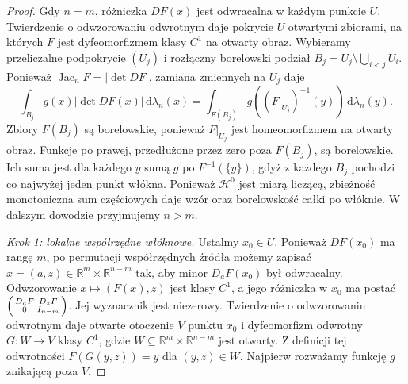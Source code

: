 \begin{proof}
Gdy $n=m$, różniczka $DF(x)$ jest odwracalna
w każdym punkcie $U$. Twierdzenie o odwzorowaniu
odwrotnym daje pokrycie $U$ otwartymi zbiorami,
na których $F$ jest dyfeomorfizmem klasy $C^1$
na otwarty obraz. Wybieramy przeliczalne podpokrycie
$(U_j)$ i rozłączny borelowski podział
$B_j=U_j\setminus\bigcup_{i<j}U_i$.
Ponieważ $\operatorname{Jac}_nF=|\det DF|$,
zamiana zmiennych na $U_j$ daje
\[
 \int_{B_j}g(x)|\det DF(x)|\,\mathrm d\lambda_n(x)
 =\int_{F(B_j)}g((F|_{U_j})^{-1}(y))
 \,\mathrm d\lambda_n(y).
\]
Zbiory $F(B_j)$ są borelowskie, ponieważ
$F|_{U_j}$ jest homeomorfizmem na otwarty obraz.
Funkcje po prawej, przedłużone przez zero poza
$F(B_j)$, są borelowskie. Ich suma jest dla każdego
$y$ sumą $g$ po $F^{-1}(\{y\})$, gdyż z każdego
$B_j$ pochodzi co najwyżej jeden punkt włókna.
Ponieważ $\mathcal H^0$ jest miarą liczącą,
zbieżność monotoniczna sum częściowych daje wzór
oraz borelowskość całki po włóknie.
W dalszym dowodzie przyjmujemy $n>m$.

\emph{Krok 1: lokalne współrzędne włóknowe.}
Ustalmy $x_0\in U$. Ponieważ $DF(x_0)$ ma rangę $m$,
po permutacji współrzędnych źródła możemy zapisać
$x=(a,z)\in\mathbb R^m\times\mathbb R^{n-m}$
tak, aby minor $D_aF(x_0)$ był odwracalny.
Odwzorowanie $x\mapsto(F(x),z)$ jest klasy $C^1$,
a jego różniczka w $x_0$ ma postać
$\begin{psmallmatrix}D_aF&D_zF\\0&I_{n-m}\end{psmallmatrix}$.
Jej wyznacznik jest niezerowy. Twierdzenie o odwzorowaniu
odwrotnym daje otwarte otoczenie $V$ punktu $x_0$
i dyfeomorfizm odwrotny $G:W\to V$ klasy $C^1$,
gdzie $W\subseteq\mathbb R^m\times\mathbb R^{n-m}$
jest otwarty. Z definicji tej odwrotności
$F(G(y,z))=y$ dla $(y,z)\in W$.
Najpierw rozważamy funkcję $g$ znikającą poza $V$.


\end{proof}

